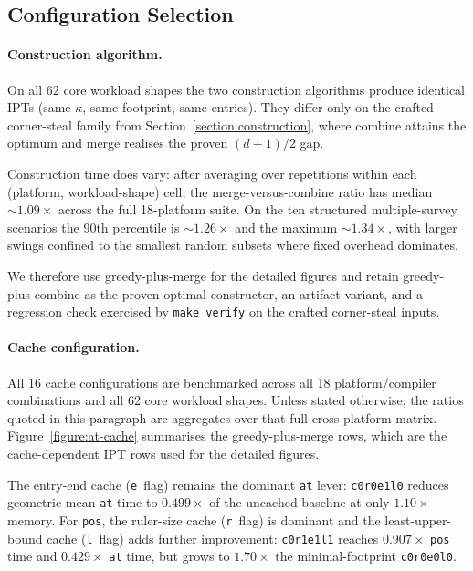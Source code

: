 \documentclass[manuscript,screen,review]{acmart}
\theoremstyle{definition}
\theoremstyle{plain}
\begin{document}
\subsection{Configuration Selection}
\label{section:selection}

\paragraph{Construction algorithm.}
On all 62 core workload shapes the two construction algorithms produce
identical IPTs (same $\kappa$, same footprint, same entries). They
differ only on the crafted corner-steal family from
Section~\ref{section:construction}, where combine attains the optimum
and merge realises the proven $(d+1)/2$ gap.

Construction time does
vary: after averaging over repetitions within each
(platform, workload-shape) cell, the merge-versus-combine ratio has
median ${\sim}1.09\times$ across the full 18-platform suite. On the
ten structured multiple-survey scenarios the 90th percentile is
${\sim}1.26\times$ and the maximum ${\sim}1.34\times$, with larger
swings confined to the smallest random subsets where fixed overhead
dominates.

We therefore use greedy-plus-merge for the detailed figures
and retain greedy-plus-combine as the proven-optimal constructor, an
artifact variant, and a regression check exercised by
\texttt{make verify} on the crafted corner-steal inputs.

\paragraph{Cache configuration.}
All 16 cache configurations are benchmarked across all 18
platform/compiler combinations and all 62 core workload shapes.
Unless stated otherwise, the ratios quoted in this paragraph are
aggregates over that full cross-platform matrix.
Figure~\ref{figure:at-cache} summarises the greedy-plus-merge rows,
which are the cache-dependent IPT rows used for the detailed figures.

The entry-end cache (\texttt{e}~flag) remains the dominant
\texttt{at} lever: \texttt{c0r0e1l0} reduces geometric-mean
\texttt{at} time to $0.499\times$ of the uncached baseline at only
$1.10\times$ memory. For \texttt{pos}, the ruler-size cache
(\texttt{r}~flag) is dominant and the least-upper-bound cache
(\texttt{l}~flag) adds further improvement: \texttt{c0r1e1l1} reaches
$0.907\times$ \texttt{pos} time and $0.429\times$ \texttt{at} time,
but grows to $1.70\times$ the minimal-footprint \texttt{c0r0e0l0}.
\end{document}
